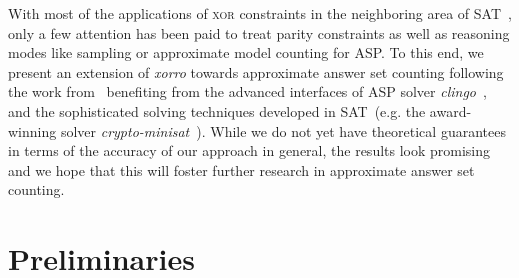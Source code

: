 \documentclass{article}
\newcommand{\XOR}{\textsc{xor}} %
\newcommand{\sysfont}{\textit}
\newcommand{\clingo}{\sysfont{clingo}}
\newcommand{\xorro}{\sysfont{xorro}}
\newcommand{\cryptominisat}{\sysfont{crypto-minisat}}
\begin{document}
%
With most of the applications of \XOR{} constraints in the neighboring area of SAT~\cite{DBLP:journals/corr/abs-1806-02239},
only a few attention has been paid to treat parity constraints as well as reasoning modes like sampling or approximate model counting for ASP. %
%
To this end, we present an extension of \xorro{} towards approximate answer set counting following the work from~\cite{ChakrabortyMV13}
benefiting from the advanced interfaces of ASP solver \clingo{}~\cite{DBLP:conf/iclp/GebserKKOSW16},
and the sophisticated solving techniques developed in SAT~(e.g. the award-winning solver \cryptominisat~\cite{DBLP:conf/sat/SoosNC09}).
%
While we do not yet have theoretical guarantees in terms of the accuracy of our approach in general,
the results look promising and we hope that this will foster further research in approximate answer set counting.
%

\section{Preliminaries}
\end{document}
